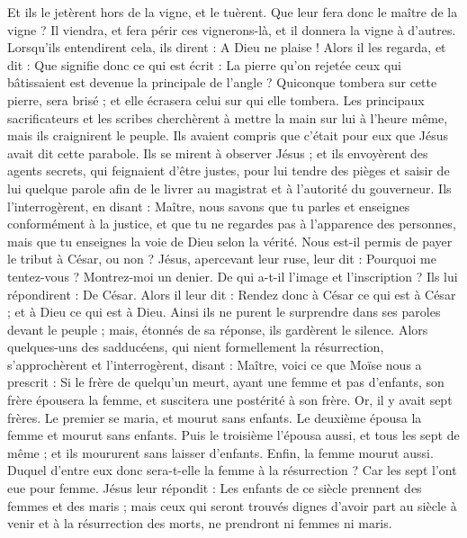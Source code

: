 \begin{multicols}{2}
Et ils le jetèrent hors de la vigne, et le tuèrent. Que leur fera donc le maître de la vigne ?
Il viendra, et fera périr ces vignerons-là, et il donnera la vigne à d'autres. Lorsqu'ils entendirent cela, ils dirent : A Dieu ne plaise !
Alors il les regarda, et dit : Que signifie donc ce qui est écrit : La pierre qu'on rejetée ceux qui bâtissaient est devenue la principale de l'angle ?
Quiconque tombera sur cette pierre, sera brisé ; et elle écrasera celui sur qui elle tombera.
Les principaux sacrificateurs et les scribes cherchèrent à mettre la main sur lui à l'heure même, mais ils craignirent le peuple. Ils avaient compris que c'était pour eux que Jésus avait dit cette parabole.
Ils se mirent à observer Jésus ; et ils envoyèrent des agents secrets, qui feignaient d'être justes, pour lui tendre des pièges et saisir de lui quelque parole afin de le livrer au magistrat et à l'autorité du gouverneur.
Ils l'interrogèrent, en disant : Maître, nous savons que tu parles et enseignes conformément à la justice, et que tu ne regardes pas à l'apparence des personnes, mais que tu enseignes la voie de Dieu selon la vérité.
Nous est-il permis de payer le tribut à César, ou non ?
Jésus, apercevant leur ruse, leur dit : Pourquoi me tentez-vous ?
Montrez-moi un denier. De qui a-t-il l'image et l'inscription ? Ils lui répondirent : De César.
Alors il leur dit : Rendez donc à César ce qui est à César ; et à Dieu ce qui est à Dieu.
Ainsi ils ne purent le surprendre dans ses paroles devant le peuple ; mais, étonnés de sa réponse, ils gardèrent le silence.
Alors quelques-uns des sadducéens, qui nient formellement la résurrection, s'approchèrent et l'interrogèrent,
disant : Maître, voici ce que Moïse nous a prescrit : Si le frère de quelqu'un meurt, ayant une femme et pas d'enfants, son frère épousera la femme, et suscitera une postérité à son frère.
Or, il y avait sept frères. Le premier se maria, et mourut sans enfants.
Le deuxième épousa la femme et mourut sans enfants.
Puis le troisième l'épousa aussi, et tous les sept de même ; et ils moururent sans laisser d'enfants.
Enfin, la femme mourut aussi.
Duquel d'entre eux donc sera-t-elle la femme à la résurrection ? Car les sept l'ont eue pour femme.
Jésus leur répondit : Les enfants de ce siècle prennent des femmes et des maris ;
mais ceux qui seront trouvés dignes d'avoir part au siècle à venir et à la résurrection des morts, ne prendront ni femmes ni maris.

\end{multicols}

